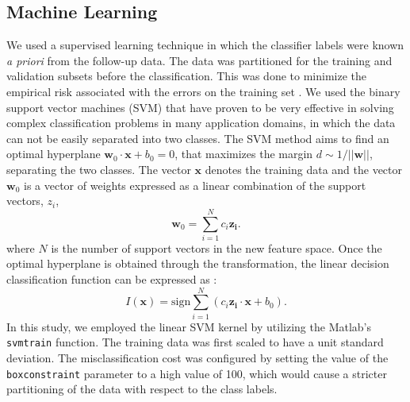 \documentclass[a4paper,twoside]{article}
\begin{document}
\subsection{Machine Learning}
% 
We used a supervised learning technique in which the classifier labels were known \emph{a priori} from the follow-up data.  The data was partitioned for the training and validation subsets before the classification. This was done to minimize the empirical risk associated with the errors on the training set \cite{vapnik_estimation_2006,vapnik_nature_2000}. We used the binary support vector machines (SVM) that have proven to be very effective in solving complex classification problems in many application domains, in which the data can not be easily separated into two classes. The SVM method aims to find an optimal hyperplane $\mathbf{w}_{0}\cdot \mathbf{x} + b_{0} = 0$, that maximizes the margin $d \sim 1/||\mathbf{w}||$, separating the two classes. The vector $\mathbf{x}$ denotes the training data and the vector $\mathbf{w}_0$ is a vector of weights expressed as a linear combination of the support vectors, $z_i$,
% 
\begin{equation}
    \mathbf{w}_0 = \sum ^{N}_{i=1} c_i \mathbf{z_i}.
\end{equation}
% 
where $N$ is the number of support vectors in the new feature space. Once the optimal hyperplane is obtained through the transformation, the linear decision classification function can be expressed as \cite{cortes1995support}:
% 
\begin{equation}
    I(\mathbf{x}) = \mathrm{sign} \sum_{i = 1}^{N} \left( c_i \mathbf{z_i} \cdot \mathbf{x} + b_{0} \right). 
\end{equation}
% 
In this study, we employed the linear SVM kernel by utilizing the Matlab's \texttt{svmtrain} function. The training data was first scaled to have a unit standard deviation. The misclassification cost was configured by setting the value of the \texttt{boxconstraint} parameter to a high value of \num{100}, which would cause a stricter partitioning of the data with respect to the class labels. 
\end{document}
